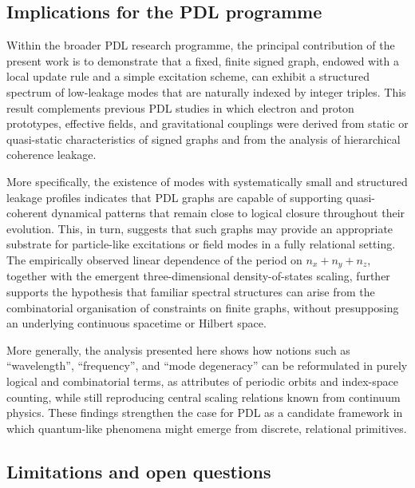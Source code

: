 \documentclass{article}
\theoremstyle{definition}
\begin{document}
\subsection{Implications for the PDL programme}

Within the broader PDL research programme, the principal contribution of the present work is to demonstrate that a fixed, finite signed graph, endowed with a local update rule and a simple excitation scheme, can exhibit a structured spectrum of low-leakage modes that are naturally indexed by integer triples.\cite{PDL_Main_2026,PDL_Position_2026} This result complements previous PDL studies in which electron and proton prototypes, effective fields, and gravitational couplings were derived from static or quasi-static characteristics of signed graphs and from the analysis of hierarchical coherence leakage.\cite{Combinatorial_Proton_v2_2026,Exponent_18_PDL_2026,Effective_Fields_PDL_2026}

More specifically, the existence of modes with systematically small and structured leakage profiles indicates that PDL graphs are capable of supporting quasi-coherent dynamical patterns that remain close to logical closure throughout their evolution. This, in turn, suggests that such graphs may provide an appropriate substrate for particle-like excitations or field modes in a fully relational setting.\cite{Topological_Reformulation_PDL_2026,ProperTime_PDL_2026} The empirically observed linear dependence of the period on $n_x + n_y + n_z$, together with the emergent three-dimensional density-of-states scaling, further supports the hypothesis that familiar spectral structures can arise from the combinatorial organisation of constraints on finite graphs, without presupposing an underlying continuous spacetime or Hilbert space.\cite{PDL_Main_2026,PDL_Global_Mapping_2026}

More generally, the analysis presented here shows how notions such as “wavelength”, “frequency”, and “mode degeneracy” can be reformulated in purely logical and combinatorial terms, as attributes of periodic orbits and index-space counting, while still reproducing central scaling relations known from continuum physics.\cite{Density_of_states_Notes,Counting_States_2021} These findings strengthen the case for PDL as a candidate framework in which quantum-like phenomena might emerge from discrete, relational primitives.

\subsection{Limitations and open questions}
\end{document}
